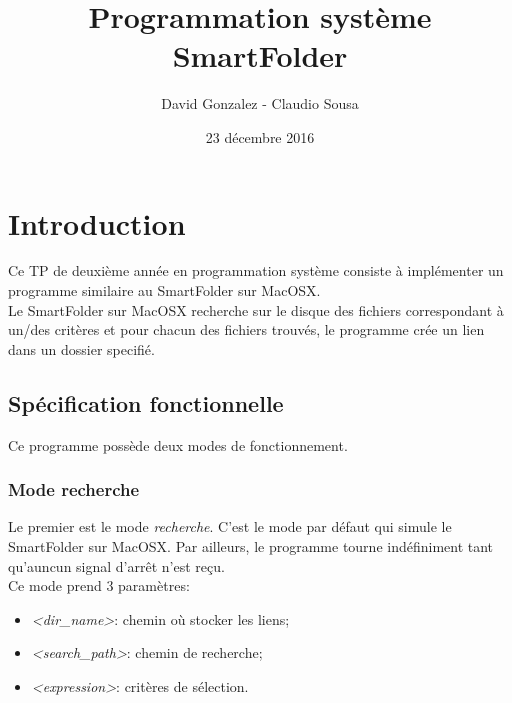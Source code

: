 \documentclass[11pt, a4paper]{article}
\begin{document}
\title
{
    \Huge{Programmation système} \\
    \Huge{SmartFolder}
}
\author
{
    \LARGE{David Gonzalez - Claudio Sousa}
}
\date{23 décembre 2016}
\maketitle

\begin{center}
\end{center}

\thispagestyle{empty}

\newpage

\section{Introduction}

Ce TP de deuxième année en programmation système consiste à implémenter un programme similaire au SmartFolder sur MacOSX. \\

Le SmartFolder sur MacOSX recherche sur le disque des fichiers correspondant à un/des critères et
pour chacun des fichiers trouvés, le programme crée un lien dans un dossier specifié.

\subsection{Spécification fonctionnelle}
Ce programme possède deux modes de fonctionnement.

\subsubsection{Mode recherche}
Le premier est le mode \textit{recherche}.
C'est le mode par défaut qui simule le SmartFolder sur MacOSX.
Par ailleurs, le programme tourne indéfiniment tant qu'auncun signal d'arrêt n'est reçu. \\

Ce mode prend 3 paramètres:
\begin{itemize}
    \item \textit{<dir\_name>}: chemin où stocker les liens;
    \item \textit{<search\_path>}: chemin de recherche;
    \item \textit{<expression>}: critères de sélection. \\
\end{itemize}
\end{document}
